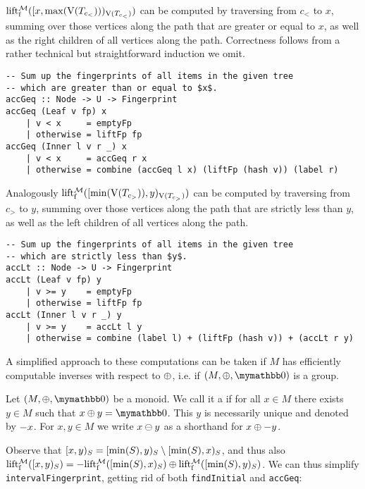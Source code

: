 $\operatorname{lift_{\operatorname{f}}^{\mathcal{M}}}([{x},{\max(\operatorname{V}(T_{c_{<}}))})_{\operatorname{V}(T_{c_{<}})})$ can be computed by traversing from $c_{<}$ to $x$, summing over those vertices along the path that are greater or equal to $x$, as well as the right children of all vertices along the path. Correctness follows from a rather technical but straightforward induction we omit.

\begin{verbatim}
-- Sum up the fingerprints of all items in the given tree
-- which are greater than or equal to $x$.
accGeq :: Node -> U -> Fingerprint
accGeq (Leaf v fp) x
    | v < x     = emptyFp
    | otherwise = liftFp fp
accGeq (Inner l v r _) x
    | v < x     = accGeq r x
    | otherwise = combine (accGeq l x) (liftFp (hash v)) (label r)
\end{verbatim}

Analogously $\operatorname{lift_{\operatorname{f}}^{\mathcal{M}}}([{\min(\operatorname{V}(T_{c_{>}}))},{y})_{\operatorname{V}(T_{c_{>}})})$ can be computed by traversing from $c_{>}$ to $y$, summing over those vertices along the path that are strictly less than $y$, as well as the left children of all vertices along the path.

\begin{verbatim}
-- Sum up the fingerprints of all items in the given tree
-- which are strictly less than $y$.
accLt :: Node -> U -> Fingerprint
accLt (Leaf v fp) y
    | v >= y    = emptyFp
    | otherwise = liftFp fp
accLt (Inner l v r _) y
    | v >= y    = accLt l y
    | otherwise = combine (label l) + (liftFp (hash v)) + (accLt r y)
\end{verbatim}

A simplified approach to these computations can be taken if $M$ has efficiently computable inverses with respect to $\oplus$, i.e. if $(M, \groupaddsym, \neutraladd)$ is a group.

\begin{definition}
Let $(M, \groupaddsym, \neutraladd)$ be a monoid.
We call it a  if for all $x \in M$ there exists $y \in M$ such that $\groupadd{x}{y} = \neutraladd$.
This $y$ is necessarily unique and denoted by $-{x}$.
For $x, y \in M$ we write ${x} \ominus {y}$ as a shorthand for ${x} \oplus {-{y}}$.
\end{definition}

Observe that $[{x},{y})_{S} = [{\min(S)},{y})_{S} \setminus [{\min(S)},{x})_{S}$, and thus also $\operatorname{lift_{\operatorname{f}}^{\mathcal{M}}}([{x},{y})_{S}) = {-{\operatorname{lift_{\operatorname{f}}^{\mathcal{M}}}([{\min(S)},{x})_{S})}} \oplus {\operatorname{lift_{\operatorname{f}}^{\mathcal{M}}}([{\min(S)},{y})_{S})}$. We can thus simplify \texttt{intervalFingerprint}, getting rid of both \texttt{findInitial} and \texttt{accGeq}:

